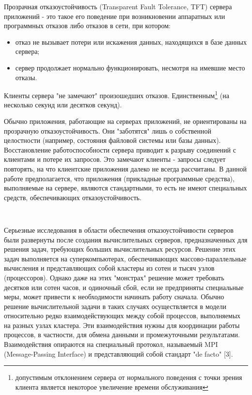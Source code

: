 \begin{multicols}{2}
Прозрачная отказоустойчивость (Transparent Fault Tolerance, TFT) сервера приложений - это такое его поведение при возникновении аппаратных или программных отказов либо отказов в сети, при котором:
\begin{itemize}
\item отказ не вызывает потери или искажения данных, находящихся в базе данных сервера;
\item сервер продолжает нормально функционировать, несмотря на имевшие место отказы.
\end{itemize}

Клиенты сервера "не замечают" произошедших отказов. Единственным\footnote{допустимым
отклонением сервера от нормального поведения с точки зрения клиента является
некоторое увеличение времени обслуживания} (на несколько секунд или десятков секунд).

Обычно приложения, работающие на серверах приложений, не ориентированы на прозрачную отказоустойчивость. Они "заботятся" лишь о собственной целостности (например, состояния файловой системы или базы данных). Восстановление работоспособности сервера приводит к разрыву соединений с клиентами и потере их запросов. Это замечают клиенты - запросы следует повторять, на что клиентские приложения далеко не всегда рассчитаны. В данной работе предполагается, что приложения (прикладные программные средства), выполняемые на сервере, являются стандартными, то есть не имеют специальных средств, обеспечивающих отказоустойчивость.
\begin{figure*}[b] %
\vspace*{1pt}
\begin{center}
\mbox{%
\epsfxsize=1.6in
\epsfxsize=100mm
}
\end{center}
\vspace*{-9pt}
\vspace*{-3pt}
\end{figure*}

Серьезные исследования в области обеспечения отказоустойчивости серверов были развернуты после создания вычислительных серверов, предназначенных для решения задач, требующих больших вычислительных ресурсов. Решение этих задач выполняется на суперкомпьютерах, обеспечивающих массово-параллельные вычисления и представляющих собой кластеры из сотен и тысяч узлов (процессоров). Однако даже на этих "монстрах" решение может требовать десятков или сотен часов, и одиночный сбой, если не предприняты специальные меры, может привести к необходимости начинать работу сначала. Обычно решение вычислительной задачи в таких случаях осуществляется в модели относительно редко взаимодействующих между собой процессов, выполняемых на разных узлах кластера. Эти взаимодействия нужны для координации работы процессов, в частности, для обмена данными и промежуточными результатами. Взаимодействия опираются на специальный протокол, называемый MPI (Message-Passing Interface) и представляющий собой стандарт "de facto" [3].


\end{multicols}
